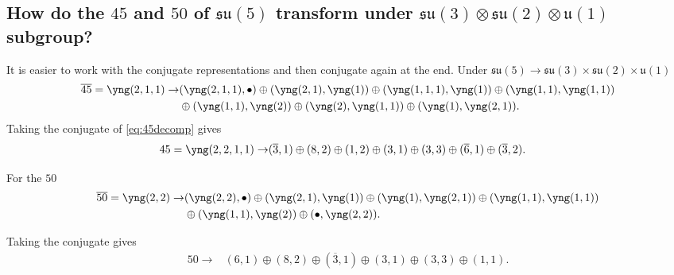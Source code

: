 \documentclass[main.tex]{subfiles}
\begin{document}
\subsection{How do the $45$ and $50$ of $\mathfrak{su}(5)$ transform under $\mathfrak{su}(3)\otimes\mathfrak{su}(2)\otimes\mathfrak{u}(1)$ subgroup?}
It is easier to work with the conjugate representations and then conjugate again at the end. Under $\mathfrak{su}(5)\rightarrow\mathfrak{su}(3)\times\mathfrak{su}(2)\times\mathfrak{u}(1)$ 
\begin{equation}\label{eq:45decomp}
\begin{split}
\overline{45}=\yng(2,1,1)\rightarrow&(\yng(2,1,1),\bullet)\oplus(\yng(2,1),\yng(1))\oplus(\yng(1,1,1),\yng(1))\oplus(\yng(1,1),\yng(1,1))\\
&\oplus(\yng(1,1),\yng(2))\oplus(\yng(2),\yng(1,1))\oplus(\yng(1),\yng(2,1)).
\end{split}
\end{equation}
Taking the conjugate of \eqref{eq:45decomp} gives
\begin{align}
45=\yng(2,2,1,1)\rightarrow&(\overline{3},1)\oplus(8,2)\oplus(1,2)\oplus(3,1)\oplus(3,3)\oplus(\overline{6},1)\oplus(\overline{3},2).
\end{align}

For the $50$
\begin{equation}
\begin{split}
\overline{50}=\yng(2,2)\rightarrow&(\yng(2,2),\bullet)\oplus(\yng(2,1),\yng(1))\oplus(\yng(1),\yng(2,1))\oplus(\yng(1,1),\yng(1,1))\\
&\oplus(\yng(1,1),\yng(2))\oplus(\bullet,\yng(2,2)).
\end{split}
\end{equation}

Taking the conjugate gives
\begin{align}
50\rightarrow&(6,1)\oplus(8,2)\oplus(\overline{3},1)\oplus(3,1)\oplus(3,3)\oplus(1,1).
\end{align}
\end{document}
